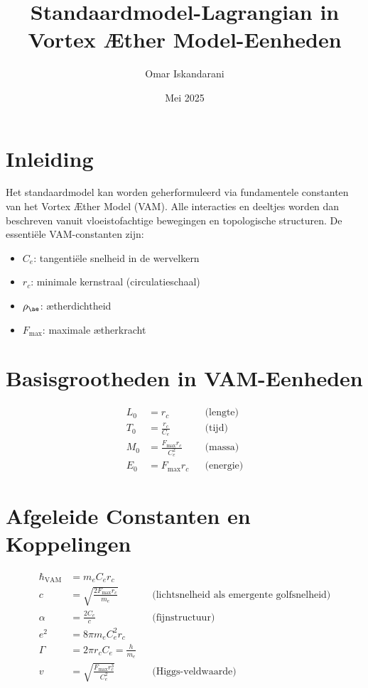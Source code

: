 \documentclass{article}
\title{Standaardmodel-Lagrangian in Vortex Æther Model-Eenheden}
\author{Omar Iskandarani}
\date{Mei 2025}
\begin{document}
    \maketitle

    \section{Inleiding}
    Het standaardmodel kan worden geherformuleerd via fundamentele constanten van het Vortex Æther Model (VAM). Alle interacties en deeltjes worden dan beschreven vanuit vloeistofachtige bewegingen en topologische structuren. De essentiële VAM-constanten zijn:
    \begin{itemize}
        \item $C_e$: tangentiële snelheid in de wervelkern
        \item $r_c$: minimale kernstraal (circulatieschaal)
        \item $\rho_{\ae}$: ætherdichtheid
        \item $F_\text{max}$: maximale ætherkracht
    \end{itemize}

    \section{Basisgrootheden in VAM-Eenheden}
    \begin{align*}
        L_0 &= r_c &&\text{(lengte)} \\
        T_0 &= \frac{r_c}{C_e} &&\text{(tijd)} \\
        M_0 &= \frac{F_\text{max} r_c}{C_e^2} &&\text{(massa)} \\
        E_0 &= F_\text{max} r_c &&\text{(energie)}
    \end{align*}

    \section{Afgeleide Constanten en Koppelingen}
    \begin{align*}
        \hbar_\text{VAM} &= m_e C_e r_c \\
        c &= \sqrt{\frac{2 F_\text{max} r_c}{m_e}} &&\text{(lichtsnelheid als emergente golfsnelheid)} \\
        \alpha &= \frac{2 C_e}{c} &&\text{(fijnstructuur)} \\
        e^2 &= 8\pi m_e C_e^2 r_c \\
        \Gamma &= 2\pi r_c C_e = \frac{h}{m_e} \\
        v &= \sqrt{\frac{F_\text{max} r_c^3}{C_e^2}} &&\text{(Higgs-veldwaarde)}
    \end{align*}
\end{document}
